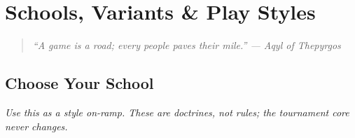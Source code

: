 \documentclass[11pt]{article}
\begin{document}
\clearpage

\section{Schools, Variants \& Play Styles}\label{sec:variants}
\begin{quote}\small\itshape
“A game is a road; every people paves their mile.” — Aqyl of Thepyrgos
\end{quote}


\subsection*{Choose Your School}
\noindent\textit{\color{muted}Use this as a style on-ramp. These are \emph{doctrines}, not rules; the tournament core never changes.}
\end{document}
